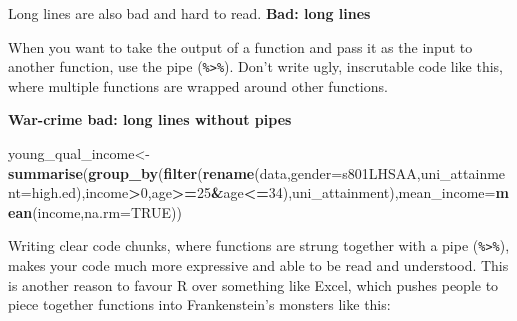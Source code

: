 \documentclass[]{book}
\newenvironment{Shaded}{\begin{snugshade}}{\end{snugshade}}
\newcommand{\DataTypeTok}[1]{\textcolor[rgb]{0.13,0.29,0.53}{#1}}
\newcommand{\DecValTok}[1]{\textcolor[rgb]{0.00,0.00,0.81}{#1}}
\newcommand{\KeywordTok}[1]{\textcolor[rgb]{0.13,0.29,0.53}{\textbf{#1}}}
\newcommand{\NormalTok}[1]{#1}
\newcommand{\OperatorTok}[1]{\textcolor[rgb]{0.81,0.36,0.00}{\textbf{#1}}}
\newcommand{\OtherTok}[1]{\textcolor[rgb]{0.56,0.35,0.01}{#1}}
\newcommand{\StringTok}[1]{\textcolor[rgb]{0.31,0.60,0.02}{#1}}
\begin{document}
Long lines are also bad and hard to read.
\textbf{Bad: long lines}

\begin{Shaded}
\end{Shaded}

When you want to take the output of a function and pass it as the input to another function, use the pipe (\texttt{\%\textgreater{}\%}). Don't write ugly, inscrutable code like this, where multiple functions are wrapped around other functions.

\textbf{War-crime bad: long lines without pipes}

\begin{Shaded}
\begin{Highlighting}[]
\NormalTok{young_qual_income<-}\KeywordTok{summarise}\NormalTok{(}\KeywordTok{group_by}\NormalTok{(}\KeywordTok{filter}\NormalTok{(}\KeywordTok{rename}\NormalTok{(data,}\DataTypeTok{gender=}\NormalTok{s801LHSAA,}\DataTypeTok{uni_attainment=}\NormalTok{high.ed),income}\OperatorTok{>}\DecValTok{0}\NormalTok{,age}\OperatorTok{>=}\DecValTok{25}\OperatorTok{&}\NormalTok{age}\OperatorTok{<=}\DecValTok{34}\NormalTok{),uni_attainment),}\DataTypeTok{mean_income=}\KeywordTok{mean}\NormalTok{(income,}\DataTypeTok{na.rm=}\OtherTok{TRUE}\NormalTok{))}
\end{Highlighting}
\end{Shaded}

Writing clear code chunks, where functions are strung together with a pipe (\texttt{\%\textgreater{}\%}), makes your code much more expressive and able to be read and understood. This is another reason to favour R over something like Excel, which pushes people to piece together functions into Frankenstein's monsters like this:
\end{document}
